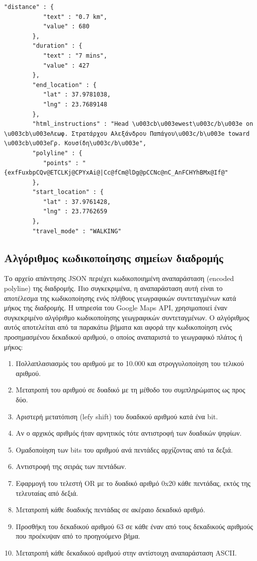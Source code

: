 \begin{lstlisting}[basicstyle=\footnotesize\ttfamily, breaklines=true]
	"distance" : {
           "text" : "0.7 km",
           "value" : 680
        },
        "duration" : {
           "text" : "7 mins",
           "value" : 427
        },
        "end_location" : {
           "lat" : 37.9781038,
           "lng" : 23.7689148
        },
        "html_instructions" : "Head \u003cb\u003ewest\u003c/b\u003e on \u003cb\u003eΛεωφ. Στρατάρχου Αλεξάνδρου Παπάγου\u003c/b\u003e toward \u003cb\u003eΓρ. Κουσίδη\u003c/b\u003e",
        "polyline" : {
           "points" : "{exfFuxbpCQv@ETCLKj@CPYxAi@|Cc@fCm@lDg@pCCNc@nC_AnFCHYhBMx@If@"
        },
        "start_location" : {
           "lat" : 37.9761428,
           "lng" : 23.7762659
        },
        "travel_mode" : "WALKING"
\end{lstlisting}


\subsection{Αλγόριθμος κωδικοποίησης σημείων διαδρομής}

Το αρχείο απάντησης JSON περιέχει κωδικοποιημένη αναπαράσταση (encoded polyline) της διαδρομής. Πιο συγκεκριμένα, η αναπαράσταση αυτή είναι το αποτέλεσμα της 
κωδικοποίησης ενός πλήθους γεωγραφικών συντεταγμένων κατά μήκος της διαδρομής. Η υπηρεσία του Google Maps API, χρησιμοποιεί έναν συγκεκριμένο αλγόριθμο κωδικοποίησης 
γεωγραφικών συντεταγμένων. Ο αλγόριθμος αυτός αποτελείται από τα παρακάτω βήματα και αφορά την κωδικοποίηση ενός προσημασμένου δεκαδικού αριθμού, ο οποίος 
αναπαριστά το γεωγραφικό πλάτος ή μήκος:

\begin{enumerate}
 \item Πολλαπλασιασμός του αριθμού με το 10.000 και στρογγυλοποίηση του τελικού αριθμού.
 \item Μετατροπή του αριθμού σε δυαδικό με τη μέθοδο του συμπληρώματος ως προς δύο.
 \item Αριστερή μετατόπιση (lefy shift) του δυαδικού αριθμού κατά ένα bit.
 \item Αν ο αρχικός αριθμός ήταν αρνητικός τότε αντιστροφή των δυαδικών ψηφίων.
 \item Ομαδοποίηση των bits του αριθμού ανά πεντάδες αρχίζοντας από τα δεξιά.
 \item Αντιστροφή της σειράς των πεντάδων.
 \item Εφαρμογή του τελεστή OR με το δυαδικό αριθμό 0x20 κάθε πεντάδας, εκτός της τελευταίας από δεξιά.
 \item Μετατροπή κάθε δυαδικής πεντάδας σε ακέραιο δεκαδικό αριθμό.
 \item Προσθήκη του δεκαδικού αριθμού 63 σε κάθε έναν από τους δεκαδικούς αριθμούς που προέκυψαν από το προηγούμενο βήμα.
 \item Μετατροπή κάθε δεκαδικού αριθμού στην αντίστοιχη αναπαράσταση ASCII.
\end{enumerate}

